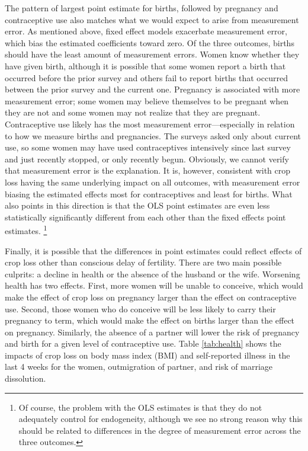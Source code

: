 \documentclass[letterpaper,12pt]{article}
\begin{document}
The pattern of largest point estimate for births, followed by
pregnancy and contraceptive use also matches what we would 
expect to arise from measurement error.
As mentioned above, fixed effect models exacerbate measurement error, 
which bias the estimated coefficients toward zero.
Of the three outcomes, births should have the least amount of 
measurement errors.
Women know whether they have given birth, 
although it is possible that some women report a birth that occurred 
before the prior survey and others fail to report births that 
occurred between the prior survey and the current one.
Pregnancy is associated with more measurement error;
some women may believe themselves to be pregnant when they are
not and some women may not realize that they are pregnant.
Contraceptive use likely has the most measurement 
error---especially in relation to how we measure births and pregnancies.
The surveys asked only about current use, so some women may
have used contraceptives intensively since last survey and 
just recently stopped, or only recently begun.
Obviously, we cannot verify that measurement error is the explanation.
It is, however, consistent with crop loss having the same underlying impact on 
all outcomes, with measurement error biasing the estimated effects most 
for contraceptives and least for births.
What also points in this direction is that the OLS point estimates 
are even less statistically significantly different from each other
than the fixed effects point estimates.%
\footnote{
Of course, the problem with the OLS estimates is that they
do not adequately control for endogeneity, although we see
no strong reason why this should be related to differences
in the degree of measurement error across the three outcomes.
}

Finally, it is possible that the differences in point estimates 
could reflect effects of crop loss other than conscious 
delay of fertility.
There are two main possible culprits: a decline in health
or the absence of the husband or the wife.
Worsening health has two effects.
First, more women will be unable to conceive, which would make
the effect of crop loss on pregnancy larger than the effect
on contraceptive use.
Second, those women who do conceive will be less likely to carry their 
pregnancy to term, which would make the effect on births 
larger than the effect on pregnancy.
Similarly, the absence of a partner will lower the risk of
pregnancy and birth for a given level of contraceptive use.
Table \ref{tab:health} shows the impacts of crop loss on body mass index 
(BMI) and self-reported illness in the last 4 weeks for the women, 
outmigration of partner, and risk of marriage dissolution. 
\end{document}
